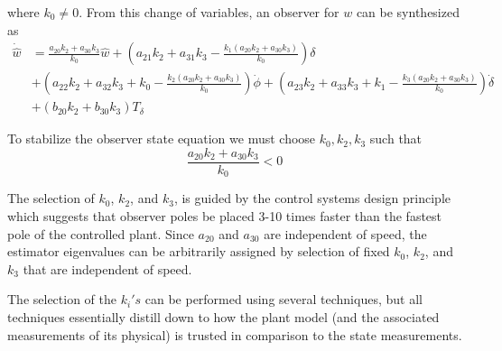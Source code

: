 \documentclass[letterpaper,11pt]{article}
\begin{document}
where $k_0\ne0$.  From this change of variables, an observer for $w$ can be
synthesized as
\begin{align*}
\dot{\hat{w}} &= \frac{a_{20} k_{2} + a_{30} k_{3}}{k_{0}} \hat{w}
 + \left(a_{21} k_{2} + a_{31} k_{3} - \frac{k_{1} \left(a_{20} k_{2} + a_{30} k_{3}\right)}{k_{0}}\right) \delta \\
 &+ \left(a_{22} k_{2} + a_{32} k_{3} + k_{0} - \frac{k_{2} \left(a_{20} k_{2} + a_{30} k_{3}\right)}{k_{0}}\right) \dot{\phi}
 + \left(a_{23} k_{2} + a_{33} k_{3} + k_{1} - \frac{k_{3} \left(a_{20} k_{2} + a_{30} k_{3}\right)}{k_{0}}\right) \dot{\delta} \\
 &+ \left(b_{20} k_{2} + b_{30} k_{3}\right) T_\delta
\end{align*}

To stabilize the observer state equation we must choose $k_0, k_2, k_3$ such
that
\begin{equation*}
\frac{a_{20} k_{2} + a_{30} k_{3}}{k_{0}} < 0
\end{equation*}

The selection of $k_0$, $k_2$, and $k_3$, is guided by the control systems
design principle which suggests that observer poles be placed 3-10 times faster
than the fastest pole of the controlled plant. Since $a_{20}$ and $a_{30}$ are
independent of speed, the estimator eigenvalues can be arbitrarily assigned by
selection of fixed $k_0$, $k_2$, and $k_3$ that are independent of speed.

The selection of the $k_i's$ can be performed using several techniques, but all
techniques essentially distill down to how the plant model (and the associated
measurements of its physical) is trusted in comparison to the state
measurements.

%
\end{document}
